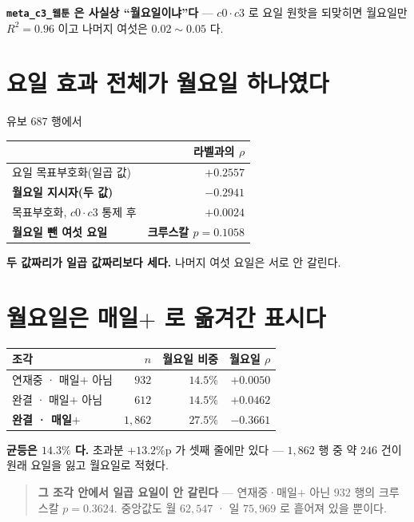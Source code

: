 \documentclass[11pt]{article}
\begin{document}
\textbf{\texttt{meta\_c3\_웹툰} 은 사실상 ``월요일이냐''다} --- $c0 \cdot c3$
로 요일 원핫을 되맞히면 월요일만 $R^2 = 0.96$ 이고 나머지 여섯은
$0.02\!\sim\!0.05$ 다.

\section{요일 효과 전체가 월요일 하나였다}

유보 $687$ 행에서

\begin{center}
\begin{tabular}{lr}
\hline
 & 라벨과의 $\rho$ \\
\hline
요일 목표부호화(일곱 값) & $+0.2557$ \\
\textbf{월요일 지시자(두 값)} & $\mathbf{-0.2941}$ \\
\hline
목표부호화, $c0 \cdot c3$ 통제 후 & $+0.0024$ \\
\textbf{월요일 뺀 여섯 요일} & \textbf{크루스칼 $p = 0.1058$} \\
\hline
\end{tabular}
\end{center}

\textbf{두 값짜리가 일곱 값짜리보다 세다.} 나머지 여섯 요일은 서로 안
갈린다.

\section{월요일은 매일$+$ 로 옮겨간 표시다}

\begin{center}
\begin{tabular}{lrrr}
\hline
조각 & $n$ & 월요일 비중 & 월요일 $\rho$ \\
\hline
연재중 · 매일$+$ 아님 & $932$ & $\mathbf{14.5\%}$ & $+0.0050$ \\
완결 · 매일$+$ 아님 & $612$ & $\mathbf{14.5\%}$ & $+0.0462$ \\
\textbf{완결 · 매일$+$} & $1{,}862$ & $\mathbf{27.5\%}$ & $\mathbf{-0.3661}$ \\
\hline
\end{tabular}
\end{center}

\textbf{균등은 $14.3\%$ 다.} 초과분 $+13.2$\%p 가 셋째 줄에만 있다 ---
$1{,}862$ 행 중 약 $246$ 건이 원래 요일을 잃고 월요일로 적혔다.

\begin{quote}
\textbf{그 조각 안에서 일곱 요일이 안 갈린다} --- 연재중·매일$+$ 아닌
$932$ 행의 크루스칼 $p = \mathbf{0.3624}$. 중앙값도 월 $62{,}547$ ·
일 $75{,}969$ 로 흩어져 있을 뿐이다.
\end{quote}
\end{document}
